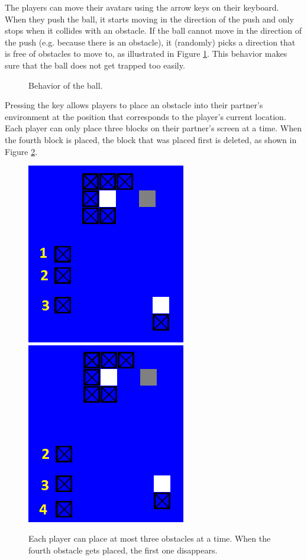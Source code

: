 
The players can move their avatars using the arrow keys on their
keyboard. When they push the ball, it starts moving in the direction
of the push and only stops when it collides with an obstacle. If the
ball cannot move in the direction of the push (e.g. because there is
an obstacle), it (randomly) picks a direction that is free of
obstacles to move to, as illustrated in Figure
\ref{fig:pushing-against-wall}. This behavior makes sure that the ball
does not get trapped too easily.

\begin{figure}
\caption{Behavior of the ball.}
\label{fig:pushing-against-wall}
\end{figure}


Pressing the  key allows players to place an obstacle
into their partner's environment at the position that corresponds to
the player's current location. Each player can only place three blocks
on their partner's screen at a time. When the fourth block is placed,
the block that was placed first is deleted, as shown in Figure
\ref{fig:dropping-blocks}.

\begin{figure}
\hspace*{\fill}\includegraphics[width=0.45\columnwidth]{blocksplaced1-cropped.png}
\hspace*{\fill}\includegraphics[width=0.45\columnwidth]{blocksplaced2-cropped.png}\hspace*{\fill}
\caption{Each player can place at most three obstacles at a time. When
  the fourth obstacle gets placed, the first one disappears.}
\label{fig:dropping-blocks}
\end{figure}

